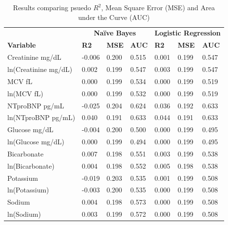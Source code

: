 \documentclass[a4paper,UKenglish]{oasics-v2016}
\begin{document}
\begin{table}[h]
\centering
\caption{Results comparing psuedo $R^2$, Mean Square Error (MSE) and Area under the Curve (AUC)}
\label{table:results1}
\begin{tabular}{llll|lll}
\hline
\textbf{}            & \multicolumn{3}{c|}{\textbf{Naïve Bayes}}  & \multicolumn{3}{l}{\textbf{Logistic Regression}} \\

\textbf{Variable}    & \textbf{R2} & \textbf{MSE} & \textbf{AUC} & \textbf{R2}    & \textbf{MSE}    & \textbf{AUC}   \\
\hline
Creatinine mg/dL     & -0.006    & 0.200      & 0.515    & 0.001       & 0.199       & 0.547       \\
ln(Creatinine mg/dL) & 0.002     & 0.199    & 0.547    & 0.003       & 0.199       & 0.547       \\
MCV fL               & 0.000     & 0.199    & 0.534    & 0.000           & 0.199       & 0.519       \\
ln(MCV fL)           & 0.000     & 0.199    & 0.532    & 0.000           & 0.199       & 0.519       \\
NTproBNP pg/mL       & -0.025    & 0.204    & 0.624    & 0.036       & 0.192       & 0.633       \\
ln(NTproBNP pg/mL)   & 0.040      & 0.191    & 0.633    & 0.044       & 0.191       & 0.633       \\
Glucose mg/dL        & -0.004    & 0.200     & 0.500      & 0.000           & 0.199       & 0.495       \\
ln(Glucose mg/dL)    & 0.000      & 0.199    & 0.494    & 0.000           & 0.199       & 0.495       \\
Bicarbonate          & 0.007     & 0.198    & 0.551    & 0.003       & 0.199       & 0.538       \\
ln(Bicarbonate)      & 0.004     & 0.198    & 0.552    & 0.005       & 0.198       & 0.538       \\
Potassium            & -0.019    & 0.203    & 0.535    & 0.001       & 0.199       & 0.508       \\
ln(Potassium)        & -0.003    & 0.200      & 0.535  & 0.000     & 0.199       & 0.508       \\
Sodium               & 0.004     & 0.198    & 0.573    & 0.000           & 0.199       & 0.508       \\
ln(Sodium)           & 0.003     & 0.199    & 0.572    & 0.000           & 0.199       & 0.508       \\
\hline
\end{tabular}
\end{table}
\end{document}
